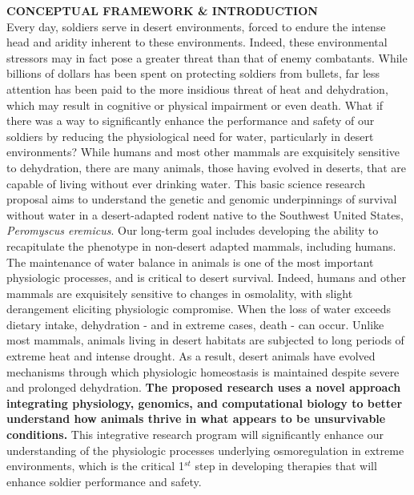 \documentclass[12pt]{article}
\begin{document}

\setcounter{page}{1}

\noindent \textbf{CONCEPTUAL FRAMEWORK \& INTRODUCTION} \\


Every day, soldiers serve in desert environments, forced to endure the intense head and aridity inherent to these environments. Indeed, these environmental stressors may in fact pose a greater threat than that of enemy combatants. While billions of dollars has been spent on protecting soldiers from bullets, far less attention has been paid to the more insidious threat of heat and dehydration, which may result in cognitive or physical impairment or even death. What if there was a way to significantly enhance the performance and safety of our soldiers by reducing the physiological need for water, particularly in desert environments? While humans and most other mammals are exquisitely sensitive to dehydration, there are many animals, those having evolved in deserts, that are capable of living without ever drinking water. This basic science research proposal aims to understand the genetic and genomic underpinnings of survival without water in a desert-adapted rodent native to the Southwest United States, \textit{Peromyscus eremicus}. Our long-term goal includes developing the ability to recapitulate the phenotype in non-desert adapted mammals, including humans.\\

The maintenance of water balance in animals is one of the most important physiologic processes, and is critical to desert survival. Indeed, humans and other mammals are exquisitely sensitive to changes in osmolality, with slight derangement eliciting physiologic compromise.  When the loss of water exceeds dietary intake, dehydration - and in extreme cases, death - can occur.  Unlike most mammals, animals living in desert habitats are subjected to long periods of extreme heat and intense drought.  As a result, desert animals have evolved mechanisms through which physiologic homeostasis is maintained despite severe and prolonged dehydration. \textbf{The proposed research uses a novel approach integrating physiology, genomics, and computational biology to better understand how animals thrive in what appears to be unsurvivable conditions.} This integrative research program will significantly enhance our understanding of the physiologic processes underlying osmoregulation in extreme environments, which is the critical 1$^{st}$ step in developing therapies that will enhance soldier performance and safety.\\
\end{document}
